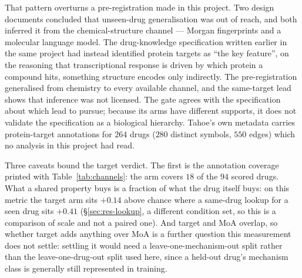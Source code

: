 That pattern overturns a pre-registration made in this project. Two design documents concluded that
unseen-drug generalisation was out of reach, and both inferred it from the chemical-structure
channel --- Morgan fingerprints and a molecular language model. The drug-knowledge specification
written earlier in the same project had instead identified protein targets as
``the key feature'', on the reasoning that transcriptional response is driven by which protein a
compound hits, something structure encodes only indirectly. The pre-registration generalised from
chemistry to every available channel, and the same-target lead shows that inference was not
licensed. The gate agrees with the specification about which lead to pursue; because its arms have
different supports, it does not validate the specification as a biological hierarchy. Tahoe's own metadata carries protein-target
annotations for $264$ drugs ($280$ distinct symbols, $550$ edges) which no analysis in this
project had read.

Three caveats bound the target verdict. The first is the annotation coverage printed with
Table~\ref{tab:channels}: the arm covers $18$ of the $94$ scored drugs. What a shared property
buys is a fraction of what the drug itself buys: on this metric the target arm sits $+0.14$ above
chance where a same-drug lookup for a seen drug sits $+0.41$ (\S\ref{sec:res-lookup}, a different
condition set, so this is a comparison of scale and not a paired one). And target and MoA
overlap, so whether target adds anything over MoA is a further question this measurement does not
settle: settling it would need a leave-one-mechanism-out split rather than the
leave-one-drug-out split used here, since a held-out drug's mechanism class is generally still
represented in training.


